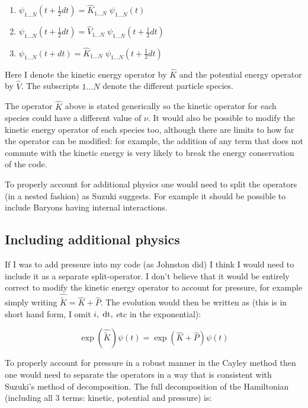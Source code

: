 \begin{enumerate}
\item $\psi_{1 \ldots N}(t + \frac{1}{2} dt) = \hat{K}_{1 \ldots N} \; \psi_{1 \ldots N} (t)$
\item $\psi_{1 \ldots N}(t + \frac{1}{2} dt) = \hat{V}_{1 \ldots N} \; \psi_{1 \ldots N} (t + \frac{1}{2} dt)$
\item $\psi_{1 \ldots N}(t + dt) = \hat{K}_{1 \ldots N} \; \psi_{1 \ldots N} (t + \frac{1}{2} dt)$
\end{enumerate}

\noindent Here I denote the kinetic energy operator by $\hat{K}$ and the potential energy operator by $\hat{V}$. The subscripts ${1 \ldots N}$ denote the different particle species.

The operator $\hat{K}$ above is stated generically so the kinetic operator for each species could have a different value of $\nu$. It would also be possible to modify the kinetic energy operator of each species too, although there are limits to how far the operator can be modified: for example, the addition of any term that does not commute with the kinetic energy is very likely to break the energy conservation of the code.

To properly account for additional physics one would need to split the operators (in a nested fashion) as Suzuki suggests. For example it should be possible to include Baryons having internal interactions.

\subsection{Including additional physics}
\label{addphys}
If I was to add pressure into my code (as Johnston did) I think I would need to include it as a separate split-operator. I don't believe that it would be entirely correct to modify the kinetic energy operator to account for pressure, for example simply writing $\hat{\tilde{K}} = \hat{K} + \hat{P}$. The evolution would then be written as (this is in short hand form, I omit $i, \; {\rm dt},$ etc in the exponential):

\begin{equation}
\exp(\hat{\tilde{K}})\psi(t) = \exp(\hat{K} + \hat{P}) \psi(t)
\end{equation}

\noindent To properly account for pressure in a robust manner in the Cayley method then one would need to separate the operators in a way that is consistent with Suzuki's method of decomposition. The full decomposition of the Hamiltonian (including all 3 terms: kinetic, potential and pressure) is:

